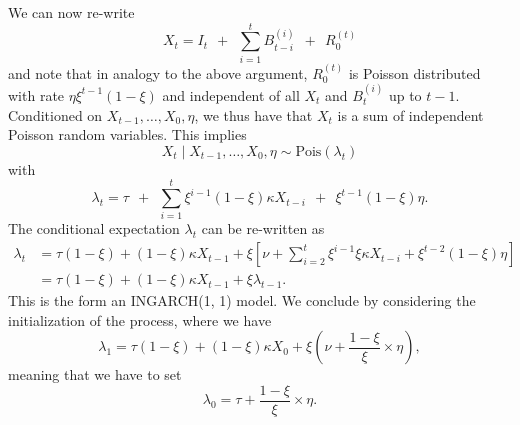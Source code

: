 \documentclass[10pt,a4paper]{article}
\begin{document}
We can now re-write
$$
X_t = I_t \ \ + \ \ \sum_{i = 1}^{t} B_{t - i}^{(i)} \ \ + \ \ R_0^{(t)}
$$
and note that in analogy to the above argument, $R_0^{(t)}$ is Poisson distributed with rate $\eta\xi^{t - 1}(1 - \xi)$ and independent of all $X_t$ and $B_t^{(i)}$ up to $t - 1$. Conditioned on $X_{t - 1}, \dots, X_0, \eta$, we thus have that $X_t$ is a sum of independent Poisson random variables. This implies
$$
X_t \mid X_{t - 1}, \dots, X_0, \eta \sim \text{Pois}(\lambda_t)
$$
with
$$
\lambda_t = \tau \ \ + \ \ \sum_{i = 1}^t \xi^{i - 1}(1 - \xi)\kappa X_{t - i} \ \ + \ \ \xi^{t - 1}(1 - \xi)\eta.
$$
The conditional expectation $\lambda_t$ can be re-written as
\begin{align*}
\lambda_t & = \tau(1 - \xi) + (1 - \xi)\kappa X_{t - 1} + \xi \left[\nu +   \sum_{i = 2}^t \xi^{i - 1}\xi\kappa X_{t - i}  + \xi^{t - 2}(1 - \xi)\eta\right]\\
& = \tau(1 - \xi) + (1 - \xi)\kappa X_{t - 1} + \xi \lambda_{t - 1}.
\end{align*}
This is the form an INGARCH(1, 1) model. We conclude by considering the initialization of the process, where we have
$$
\lambda_1 = \tau(1 - \xi) + (1 - \xi)\kappa X_0 + \xi\left(\nu + \frac{1 - \xi}{\xi} \times \eta \right),
$$
meaning that we have to set
$$
\lambda_0 = \tau + \frac{1 - \xi}{\xi} \times \eta.
$$

%
%
%

\end{document}
